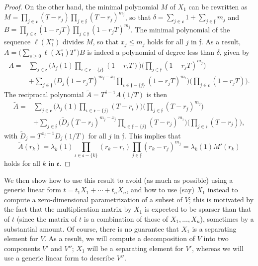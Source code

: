 \documentclass[12pt]{article}
\begin{document}
\begin{proof}
On the other hand, the minimal polynomial $M$ of $X_1$ can be rewritten as $M=\prod_{j\in
  \mathfrak{e}}(T-r_j) \prod_{j \in \mathfrak{f}}(T-r_j)^{m_j}$, so
that $\delta=\sum_{j \in \mathfrak{e}} 1 + \sum_{j\in \mathfrak{f}}
m_j$ and $B=\prod_{j\in \mathfrak{e}}(1-r_j T) \prod_{j \in
  \mathfrak{f}}(1-r_j T)^{m_j}$. The minimal polynomial
of the sequence $\ell(X_1^s)$ divides $M$, so that $x_j \le m_j$ holds for all $j$ in
$\mathfrak{f}$.
As a result,  $A =\big ( \sum_{s \ge 0} \ell(X_1^s) T^s \big ) B$ is 
indeed a polynomial of degree less than $\delta$, given by
\begin{align*}
  A=&
\sum_{j \in \mathfrak{e}}
\Big(
\lambda_j(1) \prod_{\iota \in \mathfrak{e}-\{j\}}(1-r_\iota T)\Big)
\Big(\prod_{j \in \mathfrak{f}}(1-r_j T)^{m_j} \Big)\\
&+
\sum_{j\in \mathfrak{f}}
\Big(D_j (1-r_j T)^{m_j-x_j}
\prod_{\iota \in \mathfrak{f}-\{j\}}(1-r_j T)^{m_\iota}\Big)
\Big(\prod_{j\in \mathfrak{e}} (1-r_jT) \Big).
\end{align*}
The reciprocal polynomial $\tilde A=T^{\delta-1} A(1/T)$ is then
\begin{align*}
\tilde  A=&
\sum_{j \in \mathfrak{e}}
\Big(
\lambda_j(1) \prod_{\iota \in \mathfrak{e}-\{j\}}(T-r_\iota)\Big)
\Big(\prod_{j \in \mathfrak{f}}(T-r_j)^{m_j} \Big)\\
&+
\sum_{j\in \mathfrak{f}}
\Big(\tilde D_j (T-r_j)^{m_j-x_j}
\prod_{\iota \in \mathfrak{f}-\{j\}}(T-r_j)^{m_\iota}\Big)
\Big(\prod_{j\in \mathfrak{e}} (T-r_j) \Big),
\end{align*}
with $\tilde D_j = T^{x_j-1} D_j(1/T)$ for all $j$ in $\mathfrak{f}$.
This implies that $$\tilde A(r_k) =\lambda_k(1) 
\prod_{\iota \in \mathfrak{e}-\{k\}}(r_k-r_\iota)
\prod_{j \in \mathfrak{f}}(r_k-r_j)^{m_j} = \lambda_k(1) M'(r_k)$$ 
holds for all $k$ in $\mathfrak{e}$.
\end{proof}

We then show how to use this result to avoid (as much as possible)
using a generic linear form $t=t_1 X_1 + \cdots + t_n X_n$, and how to
use (say) $X_1$ instead to compute a zero-dimensional parametrization
of a subset of $V$; this is motivated by the fact that the
multiplication matrix by $X_1$ is expected to be sparser than that of
$t$ (since the matrix of $t$ is a combination of those of
$X_1,\dots,X_n$), sometimes by a substantial amount. Of course, there
is no guarantee that $X_1$ is a separating element for $V$. As a
result, we will compute a decomposition of $V$ into two components
$V'$ and $V''$; $X_1$ will be a separating element for $V'$, whereas
we will use a generic linear form to describe $V''$.
\end{document}
